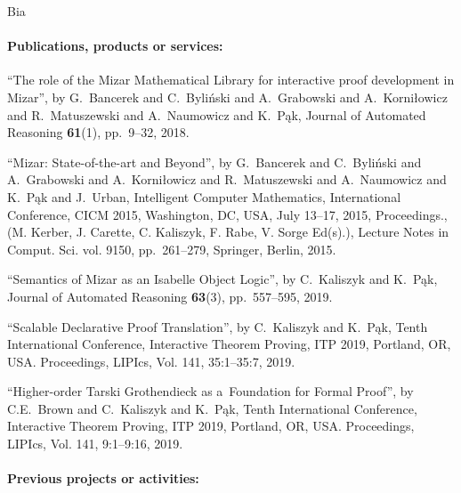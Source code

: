 \begin{sitedescription}{Bia}
\paragraph*{Publications, products or services:}

\begin{compactitem}

\item ``The role of the {M}izar {M}athematical {L}ibrary for interactive proof development in {M}izar'',
by G.~Bancerek and C.~Byliński and A.~Grabowski and A.~Korniłowicz and R.~Matuszewski and A.~Naumowicz and K.~Pąk,
Journal of Automated Reasoning \textbf{61}(1), pp.~9--32, 2018.

\item ``Mizar: State-of-the-art and Beyond'',
by G.~Bancerek and C.~Byliński and A.~Grabowski and A.~Korniłowicz and R.~Matuszewski and A.~Naumowicz and K.~Pąk and J.~Urban,
Intelligent Computer Mathematics, International Conference, CICM 2015, Washington, DC, USA, 
July 13--17, 2015, Proceedings., (M. Kerber, J. Carette, C. Kaliszyk, F. Rabe, V. Sorge Ed(s).), 
Lecture Notes in Comput. Sci. vol. 9150, pp.~261--279, Springer, Berlin, 2015.

\item ``Semantics of Mizar as an Isabelle Object Logic'',
by C.~Kaliszyk and K.~Pąk,
Journal of Automated Reasoning \textbf{63}(3), pp.~557--595, 2019.

\item ``Scalable Declarative Proof Translation'',
by C.~Kaliszyk and K.~Pąk,
Tenth International Conference, Interactive Theorem Proving, ITP 2019, Portland, OR, USA. 
Proceedings,  LIPIcs, Vol. 141, 35:1--35:7, 2019.

\item ``Higher-order Tarski Grothendieck as a~Foundation for Formal Proof'',
by C.E.~Brown and C.~Kaliszyk and K.~Pąk,
Tenth International Conference, Interactive Theorem Proving, ITP 2019, Portland, OR, USA. 
Proceedings,  LIPIcs, Vol. 141, 9:1--9:16, 2019.

\end{compactitem}

\paragraph*{Previous projects or activities:}


\end{sitedescription}

